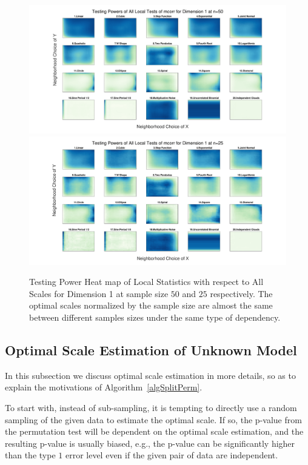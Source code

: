 \documentclass[11pt]{article}
\begin{document}
\begin{figure}[htbp]
\includegraphics[width=1.0\textwidth]{../Figures/Fig2b}
\includegraphics[width=1.0\textwidth]{../Figures/Fig2c}
\caption{Testing Power Heat map of Local Statistics with respect to All Scales for Dimension 1 at sample size $50$ and $25$ respectively. The optimal scales normalized by the sample size are almost the same between different samples sizes under the same type of dependency. }
\label{figSim2a}
\end{figure}

\subsection{Optimal Scale Estimation of Unknown Model}
\label{appen:discuss}
In this subsection we discuss optimal scale estimation in more details, so as to explain the motivations of Algorithm~\ref{algSplitPerm}.

To start with, instead of sub-sampling, it is tempting to directly use a random sampling of the given data to estimate the optimal scale. If so, the p-value from the permutation test will be dependent on the optimal scale estimation, and the resulting p-value is usually biased, e.g., the p-value can be significantly higher than the type $1$ error level even if the given pair of data are independent. 
\end{document}
